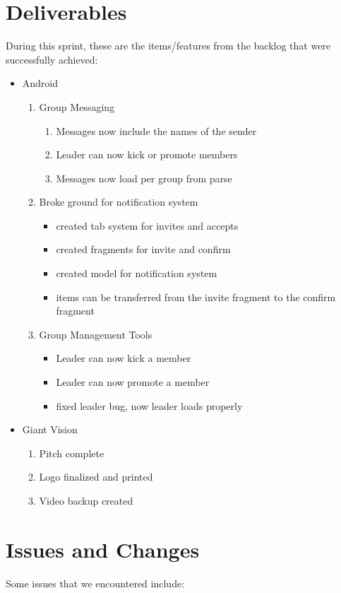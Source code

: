 \documentclass[11pt]{article}
\begin{document}
\section*{Deliverables}
During this sprint, these are the items/features from the backlog that were successfully achieved:
	\begin{itemize}
	\item Android
		\begin{enumerate}
		\item Group Messaging
			\begin{enumerate}
				\item Messages now include the names of the sender
				\item Leader can now kick or promote members
				\item Messages now load per group from parse
			\end{enumerate}
		\item Broke ground for notification system
			\begin{itemize}
				\item created tab system for invites and accepts
				\item created fragments for invite and confirm
				\item created model for notification system
				\item items can be transferred from the invite fragment to the confirm fragment
			\end{itemize}
		\item Group Management Tools
			\begin{itemize}
				\item Leader can now kick a member
				\item Leader can now promote a member
				\item fixed leader bug, now leader loads properly
			\end{itemize}
		\end{enumerate}
	\item Giant Vision
	\begin{enumerate}
		\item Pitch complete
		\item Logo finalized and printed
		\item Video backup created
	\end{enumerate}
	\end{itemize}

\section*{Issues and Changes}
Some issues that we encountered include:
\end{document}
